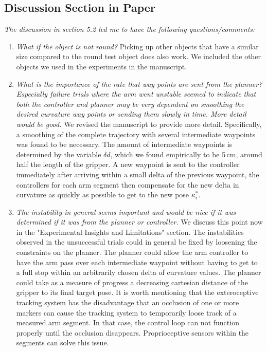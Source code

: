 \documentclass[letterpaper, 10 pt, twocolumn, conference]{article}
\newcommand{\unit}[1]{\ensuremath{\, \mathrm{#1}}} %
\begin{document}
\subsection{Discussion Section in Paper}
\textit{The discussion in section 5.2 led me to have the following questions/comments:}
\begin{enumerate}
\item \textit{What if the object is not round?}
%
Picking up other objects that have a similar size compared to the round test object does also work. We included the other objects we used in the experiments in the manuscript. 
%
\item \textit{What is the importance of the rate that way points are sent from the planner? Especially failure trials where the arm went unstable seemed to indicate that both the controller and planner may be very dependent on smoothing the desired curvature way points or sending them slowly in time. More detail would be good.}
%
We revised the manuscript to provide more detail. Specifically, a smoothing of the complete trajectory with several intermediate waypoints was found to be necessary. The amount of intermediate waypoints is determined by the variable $\delta d$, which we found empirically to be 5\unit{cm}, around half the length of the gripper. A new waypoint is sent to the controller immediately after arriving within a small delta of the previous waypoint, the controllers for each arm segment then compensate for the new delta in curvature as quickly as possible to get to the new pose $\kappa_i^*$.
%
\item \textit{ The instability in general seems important and would be nice if it was determined if it was from the planner or controller.}
%
We discuss this point now in the "Experimental Insights and Limitations" section. The instabilities observed in the unsuccessful trials could in general be fixed by loosening the constraints on the planner. The planner could allow the arm controller to have the arm pass over each intermediate waypoint without having to get to a full stop within an arbitrarily chosen delta of curvature values. The planner could take as a measure of progress a decreasing cartesian distance of the gripper to its final target pose.
It is worth mentioning that the exteroceptive tracking system has the disadvantage that an occlusion of one or more markers can cause the tracking system to temporarily loose track of a measured arm segment. In that case, the control loop can not function properly until the occlusion disappears. Proprioceptive sensors within the segments can solve this issue.
%
\end{enumerate}
\end{document}
